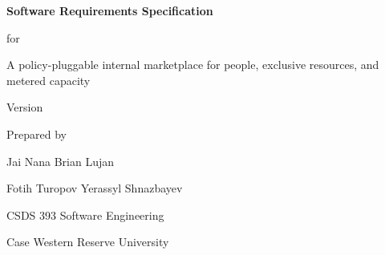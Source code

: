 \begin{titlepage}
  \centering
  \vspace*{3cm}
  {\Huge\bfseries Software Requirements Specification\par}
  \vspace{0.6cm}
  {\LARGE for\par}
  \vspace{0.6cm}
  {\Huge\bfseries \SRSproduct\par}
  \vspace{0.4cm}
  {\Large A policy-pluggable internal marketplace for people, exclusive resources, and metered capacity\par}
  \vspace{1.5cm}
  {\Large Version \SRSversion\par}
  \vspace{0.4cm}
  {\large \SRSdate\par}
  \vfill
  {\large Prepared by\par}
  {\Large Jai Nana \quad Brian Lujan\par Fotih Turopov \quad Yerassyl Shnazbayev\par}
  \vspace{0.8cm}
  {\large CSDS 393 Software Engineering\par Case Western Reserve University\par}
  \vspace{1cm}
\end{titlepage}

